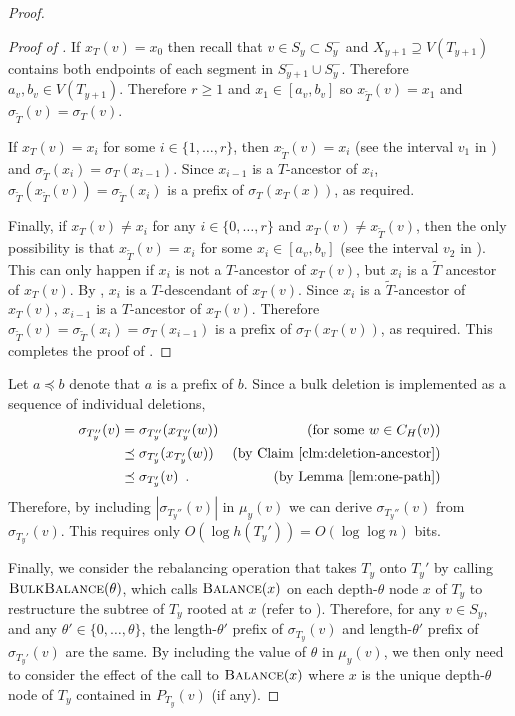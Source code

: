 \documentclass[kpfonts]{patmorin}
\let\ge\geqslant
\begin{document}
\begin{proof}
\begin{proof}[Proof of ]
    If $x_T(v)=x_0$ then recall that $v\in S_y\subset S^-_y$ and $X_{y+1}\supseteq V(T_{y+1})$ contains both endpoints of each segment in $S^-_{y+1}\cup S^-_y$.  Therefore $a_v,b_v\in V(T_{y+1})$.  Therefore $r\ge 1$ and $x_1\in [a_v,b_v]$ so $x_{\tilde{T}}(v)=x_1$ and $\sigma_{\tilde{T}}(v)=\sigma_T(v)$.
    
    If $x_T(v)=x_i$ for some $i\in\{1,\ldots,r\}$, then $x_{\tilde{T}}(v)=x_i$ (see the interval $v_1$ in ) and $\sigma_{\tilde{T}}(x_i)=\sigma_{T}(x_{i-1})$.  Since $x_{i-1}$ is a $T$-ancestor of $x_i$, $\sigma_{\tilde{T}}(x_{\tilde{T}}(v))=\sigma_{\tilde{T}}(x_i)$ is a prefix of $\sigma_{T}(x_{T}(x))$, as required.
    
    Finally, if $x_T(v)\neq x_i$ for any $i\in\{0,\ldots,r\}$ and $x_T(v)\neq x_{\tilde{T}}(v)$, then the only possibility is that $x_{\tilde{T}}(v)=x_i$ for some $x_i\in [a_v,b_v]$ (see the interval $v_2$ in ).  This can only happen if $x_i$ is not a $T$-ancestor of $x_T(v)$, but $x_i$ is a $\tilde{T}$ ancestor of $x_T(v)$.  By , $x_i$ is a $T$-descendant of $x_T(v)$.  Since $x_i$ is a $\tilde{T}$-ancestor of $x_T(v)$, $x_{i-1}$ is a $T$-ancestor of $x_T(v)$.  Therefore $\sigma_{\tilde{T}}(v)=\sigma_{\tilde{T}}(x_i)=\sigma_T(x_{i-1})$ is a prefix of $\sigma_T(x_T(v))$, as required.  This completes the proof of .    
  \end{proof}
  
  Let $a\preceq b$ denote that $a$ is a prefix of $b$.
  Since a bulk deletion is implemented as a sequence of individual deletions,
  \begin{align*}
    \sigma_{T_y''}(v) 
      & = \sigma_{T_y''}(x_{T_y''}(w)) & \text{(for some $w\in C_H(v)$)} \\
      & \preceq \sigma_{T_y'}(x_{T_y'}(w)) & \text{(by \clmref{deletion-ancestor})} \\
      & \preceq \sigma_{T_y'}(v) \enspace . & \text{(by \lemref{one-path})}
  \end{align*} 
  Therefore, by including $|\sigma_{T_y''}(v)|$ in $\mu_y(v)$ we can derive $\sigma_{T_y''}(v)$ from $\sigma_{T_y'}(v)$.  This requires only $O(\log h({T_y'}))=O(\log\log n)$ bits.
  
  Finally, we consider the rebalancing operation that takes $T_y$ onto $T_y'$ by calling $\textsc{BulkBalance}(\theta)$, which calls $\textsc{Balance}(x)$ on each depth-$\theta$ node $x$ of $T_y$ to restructure the subtree of $T_y$ rooted at $x$ (refer to ). Therefore, for any $v\in S_y$, and any $\theta'\in\{0,\ldots,\theta\}$, the length-$\theta'$ prefix of $\sigma_{T_y}(v)$ and length-$\theta'$ prefix of $\sigma_{T_y'}(v)$ are the same.  By including the value of $\theta$ in $\mu_y(v)$, we then only need to consider the effect of the call to $\textsc{Balance}(x)$ where $x$ is the unique depth-$\theta$ node of $T_y$ contained in $P_{T_y}(v)$ (if any).
  

\end{proof}
\end{document}
